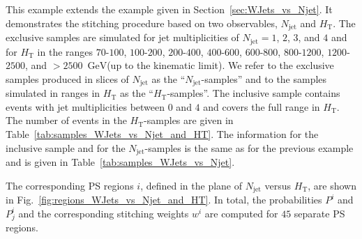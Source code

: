 \documentclass[twocolumn,epjc3]{svjour3}
\newcommand{\HT}{\ensuremath{H_{\mathrm{T}}}\xspace}
\newcommand{\GeV}{\ensuremath{\textrm{GeV}}\xspace}
\newcommand{\jet}{\ensuremath{\textrm{jet}}\xspace}
\begin{document}
This example extends the example given in Section~\ref{sec:WJets_vs_Njet}.
It demonstrates the stitching procedure based on two observables, $N_{\jet}$ and $\HT$.
The exclusive samples are simulated for jet multiplicities of $N_{\jet} = 1$, $2$, $3$, and $4$ 
and for $\HT$ in the ranges $70$-$100$, $100$-$200$, $200$-$400$, $400$-$600$, $600$-$800$, $800$-$1200$, $1200$-$2500$, and $> 2500$~\GeV (up to the kinematic limit).
We refer to the exclusive samples produced in slices of $N_{\jet}$ as the ``$N_{\jet}$-samples''
and to the samples simulated in ranges in $\HT$ as the ``$\HT$-samples''.
The inclusive sample contains events with jet multiplicities between $0$ and $4$ and covers the full range in $\HT$.
The number of events in the $\HT$-samples are given in Table~\ref{tab:samples_WJets_vs_Njet_and_HT}.
The information for the inclusive sample and for the $N_{\jet}$-samples is the same as for the previous example
and is given in Table~\ref{tab:samples_WJets_vs_Njet}.

The corresponding PS regions $i$, defined in the plane of $N_{\jet}$ versus $\HT$, are shown in Fig.~\ref{fig:regions_WJets_vs_Njet_and_HT}.
In total, the probabilities $P^{i}$ and $P_{j}^{i}$ and the corresponding stitching weights $w^{i}$ are computed for $45$ separate PS regions.
\end{document}
